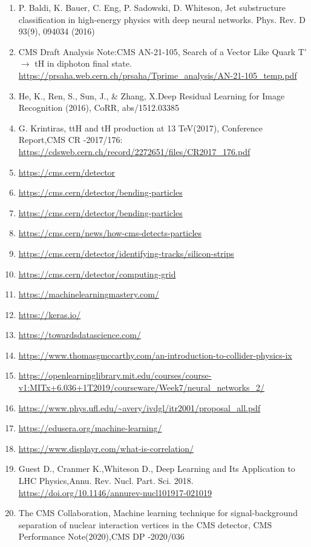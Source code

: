 \begin{thebibliography}{9}
\begin{enumerate}
\item P. Baldi, K. Bauer, C. Eng, P. Sadowski, D. Whiteson, Jet substructure classification in high-energy physics with deep neural
networks. Phys. Rev. D 93(9), 094034 (2016)

\item CMS Draft Analysis Note:CMS AN-21-105, Search of a Vector Like Quark T' $\longrightarrow$ tH in diphoton final state. \url{https://prsaha.web.cern.ch/prsaha/Tprime_analysis/AN-21-105_temp.pdf}

\item He, K., Ren, S., Sun, J., \& Zhang, X.Deep Residual Learning for Image Recognition (2016), CoRR, abs/1512.03385

\item G. Krintiras, ttH and tH production at 13 TeV(2017), Conference Report,CMS CR -2017/176: \url{ https://cdsweb.cern.ch/record/2272651/files/CR2017_176.pdf}


\item \url{https://cms.cern/detector}
\item \url{https://cms.cern/detector/bending-particles}
\item \url{https://cms.cern/detector/bending-particles}
\item \url{https://cms.cern/news/how-cms-detects-particles}
\item \url{https://cms.cern/detector/identifying-tracks/silicon-strips}
\item \url{https://cms.cern/detector/computing-grid}
\item \url{https://machinelearningmastery.com/}
\item \url{https://keras.io/}
\item \url{https://towardsdatascience.com/}
\item \url{https://www.thomasgmccarthy.com/an-introduction-to-collider-physics-ix}
\item \url{https://openlearninglibrary.mit.edu/courses/course-v1:MITx+6.036+1T2019/courseware/Week7/neural_networks_2/}
\item \url{https://www.phys.ufl.edu/~avery/ivdgl/itr2001/proposal_all.pdf}
\item \url{https://edusera.org/machine-learning/}
\item \url{https://www.displayr.com/what-is-correlation/}

\item Guest D., Cranmer K.,Whiteson D., Deep Learning and Its Application to LHC Physics,Annu. Rev. Nucl. Part. Sci. 2018. \url{https://doi.org/10.1146/annurev-nucl101917-021019}


\item The CMS Collaboration, Machine learning technique for signal-background separation of nuclear interaction vertices in the CMS detector, CMS Performance Note(2020),CMS DP -2020/036
\end{enumerate}

\end{thebibliography}
